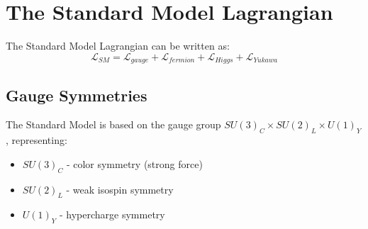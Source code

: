 \section{The Standard Model Lagrangian}
\label{sec:THEORY_THE_STANDARD_MODEL_LAGRANGIAN}

The Standard Model Lagrangian can be written as:
\begin{equation}
  \mathcal{L}_{SM} = \mathcal{L}_{gauge} + \mathcal{L}_{fermion} + \mathcal{L}_{Higgs} + \mathcal{L}_{Yukawa}
  \label{eq:sm-lagrangian}
\end{equation}

\subsection{Gauge Symmetries}
\label{sec:THEORY_THE_STANDARD_MODEL_LAGRANGIAN_GAUGE_SYMMETRIES}

The Standard Model is based on the gauge group $SU(3)_C \times SU(2)_L \times U(1)_Y$, representing:
\begin{itemize}
  \item $SU(3)_C$ - color symmetry (strong force)
  \item $SU(2)_L$ - weak isospin symmetry
  \item $U(1)_Y$ - hypercharge symmetry
\end{itemize}

